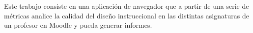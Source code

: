 
Este trabajo consiste en una aplicación de navegador que a partir de una serie de métricas analice la calidad del diseño instruccional en las distintas asignaturas de un profesor en Moodle y pueda generar informes.

